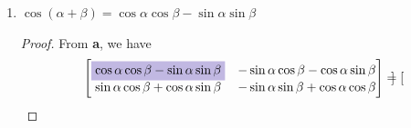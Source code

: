 \documentclass{article}
\begin{document}
\begin{enumerate}
\begin{enumerate}
\begin{proof}
\begin{align*}
                &\begin{bmatrix}
                    \cos\alpha&-\sin\alpha \\ \sin\alpha&\cos\alpha
                \end{bmatrix} \\
                \begin{bmatrix}
                    \cos\beta&\sin\beta \\ -\sin\beta&\cos\beta
                \end{bmatrix} & \begin{bmatrix}
                    \cos\alpha\cos\beta + \sin\alpha\sin\beta&-\sin\alpha\cos\beta+\cos\alpha\sin\beta \\ 
                    -\cos\alpha\sin\beta + \sin\alpha\cos\beta& \sin\alpha\sin\beta + \cos\alpha\cos\beta
                \end{bmatrix}.
            \end{align*} Setting this to be equal to \(X\) and rearranging some terms, \[
                \begin{bmatrix}
                    \cos\alpha\cos\beta + \sin\alpha\sin\beta&-\sin\alpha\cos\beta+\cos\alpha\sin\beta \\ 
                    \colorbox{Periwinkle!42}{\(\sin\alpha\cos\beta -\cos\alpha\sin\beta\)} & \sin\alpha\sin\beta + \cos\alpha\cos\beta
                \end{bmatrix} = \begin{bmatrix}
                    \cos(\alpha - \beta)&-\sin(\alpha - \beta) \\ \colorbox{Periwinkle!42}{\(\sin(\alpha-\beta)\)}&\cos(\alpha - \beta)
                \end{bmatrix}
            \] gives us \(\sin(\alpha - \beta) = \sin\alpha\cos\beta - \cos\alpha\sin\beta\), which proves the identity. 
        \end{proof}
        \item \(\cos(\alpha + \beta) = \cos\alpha\cos\beta - \sin\alpha\sin\beta\)\begin{proof}
            From \textbf{a}, we have\[
                \begin{bmatrix}
                    \colorbox{Periwinkle!42}{\(\cos\alpha\cos\beta - \sin\alpha\sin\beta\)}&-\sin\alpha\cos\beta-\cos\alpha\sin\beta \\ 
                    \sin\alpha\cos\beta + \cos\alpha\sin\beta& -\sin\alpha\sin\beta + \cos\alpha\cos\beta
                \end{bmatrix} = \begin{bmatrix}

\end{bmatrix}\]
\end{proof}
\end{enumerate}
\end{enumerate}
\end{document}
